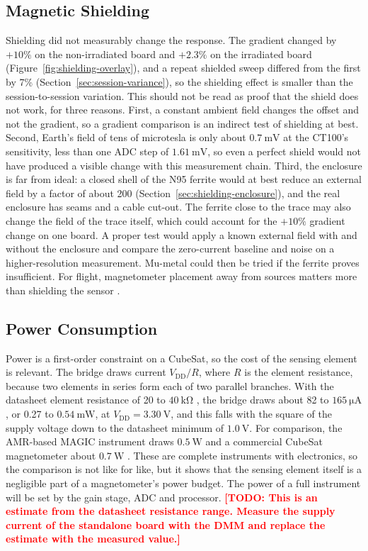 \documentclass[12pt,a4paper]{article}
\newcommand{\todo}[1]{\textcolor{red}{\textbf{[TODO: #1]}}}
\begin{document}
\subsection{Magnetic Shielding}
\label{sec:disc-shielding}

Shielding did not measurably change the response. The gradient changed by $+10\%$ on the non-irradiated board and $+2.3\%$ on the irradiated board (Figure~\ref{fig:shielding-overlay}), and a repeat shielded sweep differed from the first by 7\% (Section~\ref{sec:session-variance}), so the shielding effect is smaller than the session-to-session variation. This should not be read as proof that the shield does not work, for three reasons. First, a constant ambient field changes the offset and not the gradient, so a gradient comparison is an indirect test of shielding at best. Second, Earth's field of tens of microtesla is only about $\SI{0.7}{\milli\volt}$ at the CT100's sensitivity, less than one ADC step of $\SI{1.61}{\milli\volt}$, so even a perfect shield would not have produced a visible change with this measurement chain. Third, the enclosure is far from ideal: a closed shell of the N95 ferrite would at best reduce an external field by a factor of about 200 (Section~\ref{sec:shielding-enclosure}), and the real enclosure has seams and a cable cut-out. The ferrite close to the trace may also change the field of the trace itself, which could account for the $+10\%$ gradient change on one board. A proper test would apply a known external field with and without the enclosure and compare the zero-current baseline and noise on a higher-resolution measurement. Mu-metal could then be tried if the ferrite proves insufficient. For flight, magnetometer placement away from sources matters more than shielding the sensor \cite{nss_magnetometer}.

\subsection{Power Consumption}
\label{sec:disc-power}

Power is a first-order constraint on a CubeSat, so the cost of the sensing element is relevant. The bridge draws current $V_{\text{DD}}/R$, where $R$ is the element resistance, because two elements in series form each of two parallel branches. With the datasheet element resistance of 20 to $\SI{40}{\kilo\ohm}$ \cite{ct100_datasheet}, the bridge draws about 82 to $\SI{165}{\micro\ampere}$, or 0.27 to $\SI{0.54}{\milli\watt}$, at $V_{\text{DD}} = \SI{3.30}{\volt}$, and this falls with the square of the supply voltage down to the datasheet minimum of $\SI{1.0}{\volt}$. For comparison, the AMR-based MAGIC instrument draws $\SI{0.5}{\watt}$ \cite{magic-radcube} and a commercial CubeSat magnetometer about $\SI{0.7}{\watt}$ \cite{nss_magnetometer}. These are complete instruments with electronics, so the comparison is not like for like, but it shows that the sensing element itself is a negligible part of a magnetometer's power budget. The power of a full instrument will be set by the gain stage, ADC and processor. \todo{This is an estimate from the datasheet resistance range. Measure the supply current of the standalone board with the DMM and replace the estimate with the measured value.}
\end{document}
